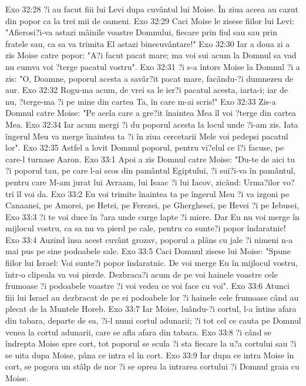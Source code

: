 Exo 32:28  ?i au facut fiii lui Levi dupa cuvântul lui Moise. În ziua aceea au cazut din popor ca la trei mii de oameni.
Exo 32:29  Caci Moise le zisese fiilor lui Levi: "Afierosi?i-va astazi mâinile voastre Domnului, fiecare prin fiul sau sau prin fratele sau, ca sa va trimita El astazi binecuvântare!"
Exo 32:30  Iar a doua zi a zis Moise catre popor: "A?i facut pacat mare; ma voi sui acum la Domnul sa vad nu cumva voi ?terge pacatul vostru".
Exo 32:31  ?i s-a întors Moise la Domnul ?i a zis: "O, Doamne, poporul acesta a savâr?it pacat mare, facându-?i dumnezeu de aur.
Exo 32:32  Rogu-ma acum, de vrei sa le ier?i pacatul acesta, iarta-i; iar de nu, ?terge-ma ?i pe mine din cartea Ta, în care m-ai scris!"
Exo 32:33  Zis-a Domnul catre Moise: "Pe acela care a gre?it înaintea Mea îl voi ?terge din cartea Mea.
Exo 32:34  Iar acum mergi ?i du poporul acesta la locul unde ?i-am zis. Iata îngerul Meu va merge înaintea ta ?i în ziua cercetarii Mele voi pedepsi pacatul lor".
Exo 32:35  Astfel a lovit Domnul poporul, pentru vi?elul ce î?i facuse, pe care-l turnase Aaron.
Exo 33:1  Apoi a zis Domnul catre Moise: "Du-te de aici tu ?i poporul tau, pe care l-ai scos din pamântul Egiptului, ?i sui?i-va în pamântul, pentru care M-am jurat lui Avraam, lui Isaac ?i lui Iacov, zicând: Urma?ilor vo?tri îl voi da.
Exo 33:2  Eu voi trimite înaintea ta pe îngerul Meu ?i va izgoni pe Canaanei, pe Amorei, pe Hetei, pe Ferezei, pe Gherghesei, pe Hevei ?i pe Iebusei,
Exo 33:3  ?i te voi duce în ?ara unde curge lapte ?i miere. Dar Eu nu voi merge în mijlocul vostru, ca sa nu va pierd pe cale, pentru ca sunte?i popor îndaratnic!
Exo 33:4  Auzind însa acest cuvânt grozav, poporul a plâns cu jale ?i nimeni n-a mai pus pe sine podoabele sale.
Exo 33:5  Caci Domnul zisese lui Moise: "Spune fiilor lui Israel: Voi sunte?i popor îndaratnic. De voi merge Eu în mijlocul vostru, într-o clipeala va voi pierde. Dezbraca?i acum de pe voi hainele voastre cele frumoase ?i podoabele voastre ?i voi vedea ce voi face cu voi".
Exo 33:6  Atunci fiii lui Israel au dezbracat de pe ei podoabele lor ?i hainele cele frumoase când au plecat de la Muntele Horeb.
Exo 33:7  Iar Moise, luându-?i cortul, l-a întins afara din tabara, departe de ea, ?i-l numi cortul adunarii; ?i tot cel ce cauta pe Domnul venea la cortul adunarii, care se afla afara din tabara.
Exo 33:8  ?i când se îndrepta Moise spre cort, tot poporul se scula ?i sta fiecare la u?a cortului sau ?i se uita dupa Moise, pâna ce intra el în cort.
Exo 33:9  Iar dupa ce intra Moise în cort, se pogora un stâlp de nor ?i se oprea la intrarea cortului ?i Domnul graia cu Moise.

